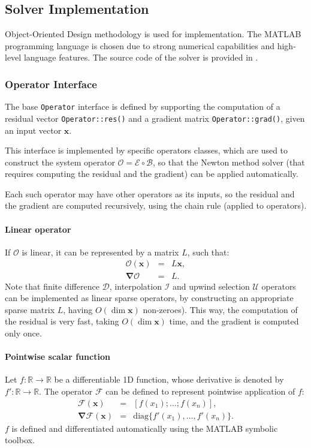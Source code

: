 \documentclass[final]{elsarticle}
\newcommand{\diag}{\ensuremath{\mathrm{diag}}}
\newcommand{\R}{\ensuremath{\mathbb{R}}}
\newcommand\bnabla{\boldsymbol{\nabla}}
\newcommand\bx{\boldsymbol{x}}
\newcommand\cB{\mathcal{B}}
\newcommand\cE{\mathcal{E}}
\newcommand\cF{\mathcal{F}}
\newcommand\cO{\mathcal{O}}
\newcommand\cI{\mathcal{I}}
\newcommand\cD{\mathcal{D}}
\begin{document}
\subsection{Solver Implementation}

Object-Oriented Design methodology is used for implementation.
The MATLAB programming language is chosen due to strong numerical capabilities
and high-level language features.
The source code of the solver is provided in \cite{source}.

\subsubsection{Operator Interface}
The base \verb|Operator| interface is defined by 
supporting the computation of a residual vector \verb|Operator::res()|
and a gradient matrix \verb|Operator::grad()|, given an input vector $\bx$.

This interface is implemented by specific operators classes,
which are used to construct the system operator $\cO = \cE \circ \cB$, so that 
the Newton method solver (that requires computing the residual and the gradient) 
can be applied automatically.

Each such operator may have other operators as its inputs, so the residual
and the gradient are computed recursively, using the chain rule (applied to operators).

\paragraph{Linear operator}
If $\cO$ is linear, it can be represented by a matrix $L$, such that:
\begin{eqnarray*}
\cO(\bx) &=& L \bx, \\
\bnabla\cO &=& L. 
\end{eqnarray*}
Note that finite difference $\cD$, interpolation $\cI$ and 
upwind selection $\mathcal{U}$ operators
can be implemented as linear sparse operators, by constructing 
an appropriate sparse matrix $L$, having $O(\dim \bx)$ non-zeroes).
This way, the computation of the residual is very fast, taking $O(\dim \bx)$ time,
and the gradient is computed only once.

\paragraph{Pointwise scalar function}
Let $f: \R \rightarrow \R$ be a differentiable 1D function, whose derivative is
denoted by $f': \R \rightarrow \R$. The operator $\cF$ can be defined to
represent pointwise application of $f$:
\begin{eqnarray*}
\cF(\bx) &=& [f(x_1); \ldots; f(x_n)], \\
\bnabla\cF(\bx) &=& \diag\{f'(x_1), \ldots, f'(x_n)\}.
\end{eqnarray*}
$f$ is defined and differentiated automatically using the MATLAB symbolic toolbox.
\end{document}
